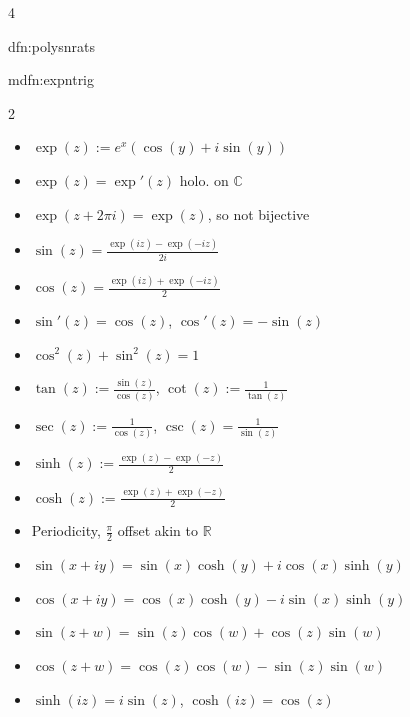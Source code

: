 \documentclass[landscape, 8pt]{extarticle}
\begin{document}
\begin{multicols*}{4}
\begin{dfn}{dfn:polysnrats}{ }
		\end{dfn}
		
		
		\begin{mdfn}{mdfn:expntrig}{ }
			\begin{multicols}{2}
				\begin{itemize}
					\item $\exp(z) := e^x(\cos(y) + i\sin(y))$
					\item $\exp(z) = \exp'(z)$ holo. on $\mathbb{C}$
					\item $\exp(z + 2 \pi i) = \exp(z)$, so not bijective
					\item $\sin(z) = \frac{\exp(iz) - \exp(-iz)}{2i}$
					\item $\cos(z) = \frac{\exp(iz) + \exp(-iz)}{2}$
					\item $\sin'(z) = \cos(z)$, $\cos'(z) = -\sin(z)$
				\end{itemize}
				
				\columnbreak
				
				\begin{itemize}
					\item $\cos^2(z) + \sin^2(z) = 1$
					\item $\tan(z) := \frac{\sin(z)}{\cos(z)}$, $\cot(z):= \frac{1}{\tan(z)}$ 
					\item $\sec(z) := \frac{1}{\cos(z)}$, $\csc(z) = \frac{1}{\sin(z)}$
					\item $\sinh(z) := \frac{\exp(z) - \exp(-z)}{2}$
					\item $\cosh(z) := \frac{\exp(z) + \exp(-z)}{2}$
					\item Periodicity, $\frac{\pi}{2}$ offset akin to $\mathbb{R}$
				\end{itemize}
				
			\end{multicols}
			
			\vspace{-11pt}
			
			\begin{itemize}
				\item $\sin(x + iy) = \sin(x)\cosh(y) + i\cos(x)\sinh(y)$
				\item $\cos(x+iy) = \cos(x)\cosh(y) - i\sin(x)\sinh(y)$
				\item $\sin(z+w) = \sin(z)\cos(w) + \cos(z)\sin(w)$
				\item $\cos(z+w) = \cos(z)\cos(w) - \sin(z)\sin(w)$
				\item $\sinh(iz) = i\sin(z)$, $\cosh(iz) = \cos(z)$
			\end{itemize}
			

\end{mdfn}
\end{multicols*}
\end{document}
